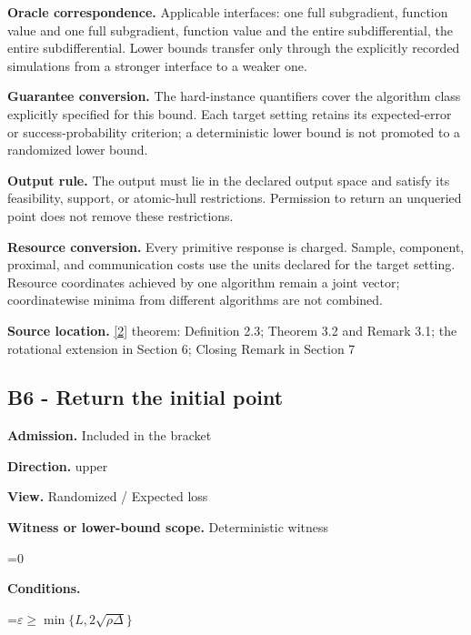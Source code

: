 \documentclass[10pt,a4paper]{article}
\newcommand{\AtlasMath}[1]{\par\begingroup\centering\setbox0=\hbox{$\displaystyle #1$}\ifdim\wd0>1.4\linewidth\typeout{ATLAS WIDE FORMULA: \the\wd0}\fi\ifdim\wd0>\linewidth\resizebox{\linewidth}{!}{\box0}\else\box0\fi\par\endgroup}
\begin{document}
\textbf{Oracle correspondence.} Applicable interfaces: one full subgradient, function value and one full subgradient, function value and the entire subdifferential, the entire subdifferential. Lower bounds transfer only through the explicitly recorded simulations from a stronger interface to a weaker one.



\textbf{Guarantee conversion.} The hard-instance quantifiers cover the algorithm class explicitly specified for this bound. Each target setting retains its expected-error or success-probability criterion; a deterministic lower bound is not promoted to a randomized lower bound.



\textbf{Output rule.} The output must lie in the declared output space and satisfy its feasibility, support, or atomic-hull restrictions. Permission to return an unqueried point does not remove these restrictions.



\textbf{Resource conversion.} Every primitive response is charged. Sample, component, proximal, and communication costs use the units declared for the target setting. Resource coordinates achieved by one algorithm remain a joint vector; coordinatewise minima from different algorithms are not combined.



\textbf{Source location.} \href{https://arxiv.org/pdf/2608.03246}{[2]} theorem: Definition 2.3; Theorem 3.2 and Remark 3.1; the rotational extension in Section 6; Closing Remark in Section 7



\subsection{B6 - Return the initial point}


\textbf{Admission.} Included in the bracket



\textbf{Direction.} upper



\textbf{View.} Randomized / Expected loss



\textbf{Witness or lower-bound scope.} Deterministic witness



\AtlasMath{0}


\textbf{Conditions.}
\AtlasMath{\varepsilon\ge\min\{L,2\sqrt{\rho\Delta}\}}
\end{document}
